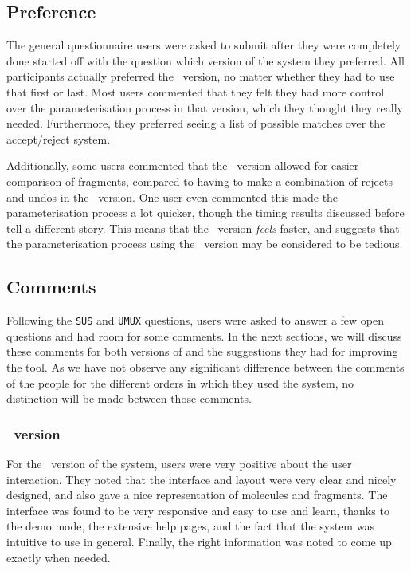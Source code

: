 \subsection{Preference}
The general questionnaire users were asked to submit after they were completely done started off with the question which version of the system they preferred. All participants actually preferred the \IDa\ version, no matter whether they had to use that first or last. Most users commented that they felt they had more control over the parameterisation process in that version, which they thought they really needed. Furthermore, they preferred seeing a list of possible matches over the accept/reject system.

Additionally, some users commented that the \IDa\ version allowed for easier comparison of fragments, compared to having to make a combination of rejects and undos in the \IDb\ version. One user even commented this made the parameterisation process a lot quicker, though the timing results discussed before tell a different story. This means that the \IDa\ version \emph{feels} faster, and suggests that the parameterisation process using the \IDb\ version may be considered to be tedious.


\subsection{Comments}
Following the \verb|SUS| and \verb|UMUX| questions, users were asked to answer a few open questions and had room for some comments. In the next sections, we will discuss these comments for both versions of \oframp{} and the suggestions they had for improving the tool. As we have not observe any significant difference between the comments of the people for the different orders in which they used the system, no distinction will be made between those comments.

\subsubsection{\IDA\ version}
For the \IDa\ version of the system, users were very positive about the user interaction. They noted that the interface and layout were very clear and nicely designed, and also gave a nice representation of molecules and fragments. The interface was found to be very responsive and easy to use and learn, thanks to the demo mode, the extensive help pages, and the fact that the system was intuitive to use in general. Finally, the right information was noted to come up exactly when needed.

